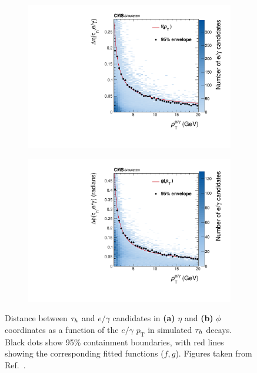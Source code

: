 \begin{figure}[h]
        \centering
        \begin{subfigure}[b]{0.49\textwidth}
            \centering
            \includegraphics[width=\textwidth]{Figures/Chapter4/HPS_Envolope_Deta.pdf}
            \caption{}
        \end{subfigure}
        \begin{subfigure}[b]{0.49\textwidth}
            \centering
            \includegraphics[width=\textwidth]{Figures/Chapter4/HPS_Envolope_Dphi.pdf}
            \caption{}
        \end{subfigure}
    \caption[Distance between $\PGt_h$ and $e/\gamma$ candidates in $\eta$ and $\phi$ coordinates as a function of the $e/\gamma$ $p_\mathrm{T}$ in simulated $\PGt_h$ decays]{Distance between $\PGt_h$ and $e/\gamma$ candidates in \textbf{(a)} $\eta$ and \textbf{(b)} $\phi$ coordinates as a function of the $e/\gamma$ $p_\mathrm{T}$ in simulated $\PGt_h$ decays. Black dots show 95\% containment boundaries, with red lines showing the corresponding fitted functions ($f,g$). Figures taken from Ref.~\cite{Tau_Reco_ID_2018}.}
    \label{Figure:Chapter4_StripSizeParametrisation}
\end{figure}

